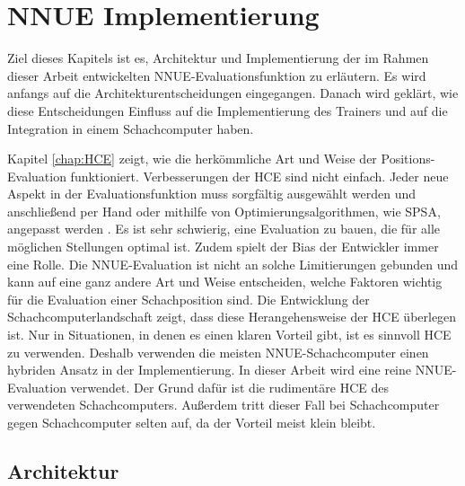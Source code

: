 \chapter{NNUE Implementierung}

Ziel dieses Kapitels ist es, Architektur und Implementierung der im Rahmen dieser Arbeit entwickelten \ac{NNUE}-Evaluationsfunktion zu erläutern. Es wird anfangs auf die Architekturentscheidungen eingegangen. Danach wird geklärt, wie diese Entscheidungen Einfluss auf die Implementierung des Trainers und auf die Integration in einem Schachcomputer haben.

Kapitel \autoref{chap:HCE} zeigt, wie die herkömmliche Art und Weise der Positions-Evaluation funktioniert. Verbesserungen der \ac{HCE} sind nicht einfach. Jeder neue Aspekt in der Evaluationsfunktion muss sorgfältig ausgewählt werden und anschließend per Hand oder mithilfe von Optimierungsalgorithmen, wie \zb{} \ac{SPSA}, angepasst werden \cite{spall1992multivariate}. Es ist sehr schwierig, eine Evaluation zu bauen, die für alle möglichen Stellungen optimal ist. Zudem spielt der Bias der Entwickler immer eine Rolle. Die \ac{NNUE}-Evaluation ist nicht an solche Limitierungen gebunden und kann auf eine ganz andere Art und Weise entscheiden, welche Faktoren wichtig für die Evaluation einer Schachposition sind. Die Entwicklung der Schachcomputerlandschaft zeigt, dass diese Herangehensweise der \ac{HCE} überlegen ist. Nur in Situationen, in denen es einen klaren Vorteil gibt, ist es sinnvoll \ac{HCE} zu verwenden. Deshalb verwenden die meisten \ac{NNUE}-Schachcomputer einen hybriden Ansatz in der Implementierung. In dieser Arbeit wird eine reine \ac{NNUE}-Evaluation verwendet. Der Grund dafür ist die rudimentäre \ac{HCE} des verwendeten Schachcomputers. Außerdem tritt dieser Fall bei Schachcomputer gegen Schachcomputer selten auf, da der Vorteil meist klein bleibt.

\section{Architektur}

